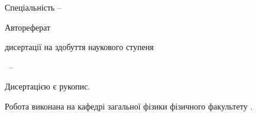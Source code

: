 \vspace{0pt plus3fill} %
\begin{center}
\textbf { \MakeUppercase
\thesisTitle}

\vspace{0pt plus3fill} %
{\large Спеціальність \thesisSpecialtyNumber -- \thesisSpecialtyTitle}

\vspace{0pt plus1.5fill} %
\Large{Автореферат}\par
\large{дисертації на здобуття наукового ступеня\par \thesisDegree}
\end{center}

\vspace{0pt plus4fill} %
{\centering\thesisCity~-- \thesisYear\par}

\newpage
\thispagestyle{empty}
\noindent Дисертацією є рукопис.
\vspace{0.008\paperheight plus1fill}

\noindent Робота виконана на кафедрі загальної фізики фізичного факультету {\thesisOfOrganization}.

